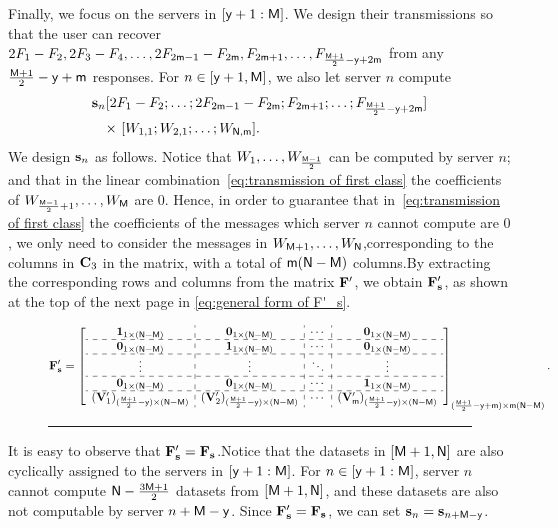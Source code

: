 \documentclass[conference,letterpaper]{IEEEtran}
\begin{document}
Finally, we focus on the servers in $[{\sf y}+1 : {\sf M}]$. We design their transmissions so that the user can recover $2F_1 - F_2, 2F_3 - F_4, \ldots, 2F_{2{\sf m}-1} - F_{2{\sf m}}, F_{2{\sf m}+1}, \ldots, F_{\frac{{\sf M}+1}{2} - {\sf y} + 2{\sf m}}$ from any $\frac{{\sf M}+1}{2} - {\sf y} + {\sf m}$ responses.
 For $n \in [{\sf y}+1, {\sf M}]$, we also let server $n$ compute
\begin{align}
{\bf s}_n & [ 2F_1 - F_2; \ldots; 2F_{2{\sf m}-1} - F_{2{\sf m}}; F_{2{\sf m}+1}; \ldots; F_{\frac{{\sf M}+1}{2} - {\sf y} + 2{\sf m}} ]  \nonumber \\
& \text{× }[ W_{1,1}; W_{2,1}; \ldots; W_{{\sf N},{\sf m}} ].
\label{eq:transmission of first class}
\end{align}
     We design ${\bf s}_{n} $ as follows.
Notice that $W_1,\ldots,W_{\frac{{\sf M}-1}{2}}$ can be computed by server $n$; and that in the linear combination~\eqref{eq:transmission of first class} the coefficients of   $W_{\frac{{\sf M}-1}{2}+1}, \ldots, W_{{\sf M}}$ are $0$. 
Hence, in order to guarantee that in~\eqref{eq:transmission of first class} the coefficients of the messages which server $n$ cannot compute are $0$, we only need to consider the messages in $W_{{\sf M}+1}, \ldots, W_{{\sf N}}$,corresponding to the columns in ${\bf C}_3$ in the matrix, with a total of ${\sf m} ({\sf N} - {\sf M})$ columns.By extracting the corresponding rows and columns from the matrix \( {\bf F}' \), we obtain \( {\bf F}'_{\bf s} \), as shown at the top of the next page in \eqref{eq:general form of F'_s}.
\begin{figure}
\begin{equation}
 {\bf F}'_{\bf s} = 
\left[
\begin{array}{c:c:c:c}
{\bf 1}_{1 \times (\Nsf-\Msf)}  & {\bf 0}_{1 \times (\Nsf-\Msf)}  & \cdots & {\bf 0}_{1 \times (\Nsf-\Msf)}   \\ \hdashline
{\bf 0}_{1 \times (\Nsf-\Msf)} &  {\bf 1}_{1 \times (\Nsf-\Msf)}   & \cdots & {\bf 0}_{1 \times (\Nsf-\Msf)}   \\ \hdashline 
 \vdots   & \vdots  &  \ddots & \vdots \\ \hdashline
 {\bf 0}_{1 \times (\Nsf-\Msf)} &   {\bf 0}_{1 \times (\Nsf-\Msf)}    & \cdots &  {\bf 1}_{1 \times (\Nsf-\Msf)} \\ \hdashline
 ({\bf V}'_{1})_{ (\frac{\Msf + 1}{2} - \ysf) \times (\Nsf-\Msf)}  &  ({\bf V}'_{2})_{ (\frac{\Msf + 1}{2} - \ysf) \times (\Nsf-\Msf)}  &   \cdots   &   ({\bf V}'_{\msf})_{ (\frac{\Msf + 1}{2} - \ysf) \times (\Nsf-\Msf)} 
 \end{array}
\right]_{(\frac{\Msf + 1}{2} - \ysf + \msf) \times \msf(\Nsf-\Msf)}.
\label{eq:general form of F'_s}
\end{equation}
\rule{\textwidth}{0.2pt} %
\end{figure}
It is easy to observe that ${\bf F}'_{\bf s} = {\bf F}_{\bf s}$.Notice that the datasets in $[{\sf M}+1, {\sf N}]$ are also cyclically assigned to the servers in $[{\sf y}+1 : {\sf M}]$. For $n \in [{\sf y}+1 : {\sf M}]$, server $n$ cannot compute ${{\sf N} - \frac{3{\sf M} + 1}{2}}$ datasets from $[{\sf M}+1, {\sf N}]$, and these datasets are also not computable by server $n + {\sf M} - {\sf y}$. Since ${\bf F}'_{\bf s} = {\bf F}_{\bf s}$, we can  set ${\bf s}_n = {\bf s}_{n + {\sf M} - {\sf y}}$.
\end{document}
